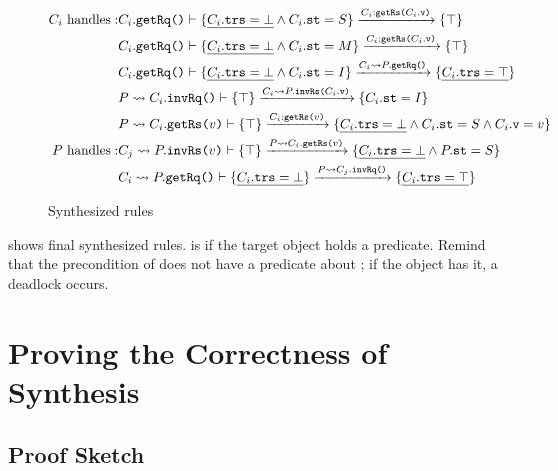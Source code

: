 \documentclass[format=manuscript]{acmart}
\begin{document}
\begin{figure}[h]
  \begin{eqnarray*}
    C_i\ \textrm{handles}: &
    C_i.\texttt{getRq()}\vdash \{ \underline{C_i.\texttt{trs} = \bot{}} \wedge C_i.\texttt{st} = S \} \xrightarrow{C_i:\texttt{getRs(}C_i.\texttt{v}\texttt{)}} \{ \top \} \\
    & C_i.\texttt{getRq()}\vdash \{ \underline{C_i.\texttt{trs} = \bot{}} \wedge C_i.\texttt{st} = M \} \xrightarrow{C_i:\texttt{getRs(}C_i.\texttt{v}\texttt{)}} \{ \top \} \\
    & C_i.\texttt{getRq()}\vdash \{ \underline{C_i.\texttt{trs} = \bot{}} \wedge C_i.\texttt{st} = I \} \xrightarrow{C_i \leadsto P.\texttt{getRq()}} \{ \underline{C_i.\texttt{trs} = \top{}} \} \\
    & P \leadsto C_i.\texttt{invRq()}\vdash \{ \top \} \xrightarrow{C_i \leadsto P.\texttt{invRs(}C_i.\texttt{v}\texttt{)}} \{ C_i.\texttt{st} = I \} \\
    & P \leadsto C_i.\texttt{getRs(}v\texttt{)}\vdash \{ \top \} \xrightarrow{C_i:\texttt{getRs(}v\texttt{)}} \{ \underline{C_i.\texttt{trs} = \bot{}} \wedge C_i.\texttt{st} = S \wedge C_i.\texttt{v} = v \} \\
    P\ \textrm{handles}: &
    C_j \leadsto P.\texttt{invRs(}v\texttt{)}\vdash \{ \top \} \xrightarrow{P \leadsto C_i.\texttt{getRs(}v\texttt{)}} \{ \underline{C_i.\texttt{trs} = \bot{}} \wedge P.\texttt{st} = S \} \\
    & C_i \leadsto P.\texttt{getRq()}\vdash \{ \underline{C_i.\texttt{trs} = \bot{}} \} \xrightarrow{P \leadsto C_j.\texttt{invRq()}} \{ \underline{C_i.\texttt{trs} = \top{}} \} \\
  \end{eqnarray*}
  \caption{Synthesized rules}
  \label{fig:synthesized-rules}
\end{figure}

 shows final synthesized rules. \trsOf{\cdot} is
\trsYes{} if the target object holds a predicate. Remind that the precondition
of  does not have a predicate about ; if the object
has it, a deadlock occurs.

\section{Proving the Correctness of Synthesis}

\subsection{Proof Sketch}
\end{document}
